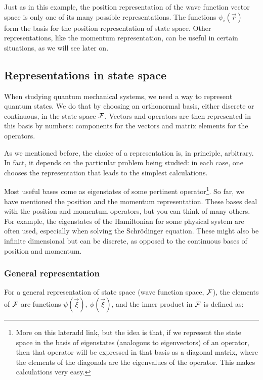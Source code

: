 Just as in this example, the position representation of the wave function vector space is only one of its many possible representations. The functions $\psi_i\left(\vec{r}\right)$ form the basis for the position representation of state space. Other representations, like the momentum representation, can be useful in certain situations, as we will see later on. 


\subsection{Representations in state space}

When studying quantum mechanical systems, we need a way to represent quantum states. We do that by choosing an orthonormal basis, either discrete or continuous, in the state space $\mathcal{F}$. Vectors and operators are then represented in this basis by numbers: components for the vectors and matrix elements for the operators.

As we mentioned before, the choice of a representation is, in principle, arbitrary. In fact, it depends on the particular problem being studied: in each case, one chooses the representation that leads to the simplest calculations. 

Most useful bases come as eigenstates of some pertinent operator\footnote{More on this later{\color{red}add link}, but the idea is that, if we represent the state space in the basis of eigenstates (analogous to eigenvectors) of an operator, then that operator will be expressed in that basis as a diagonal matrix, where the elements of the diagonals are the eigenvalues of the operator. This makes calculations very easy.}. So far, we have mentioned the position and the momentum representation. These bases deal with the position and momentum operators, but you can think of many others. For example, the eigenstates of the Hamiltonian for some physical system are often used, especially when solving the Schrödinger equation. These might also be infinite dimensional but can be discrete, as opposed to the continuous bases of position and momentum.

\subsubsection{General representation}

For a general representation of state space (wave function space, $\mathcal{F}$), the elements of $\mathcal{F}$ are functions $\psi(\vec{\xi}),\ \phi(\vec{\xi})$, and the inner product in $\mathcal{F}$ is defined as:

